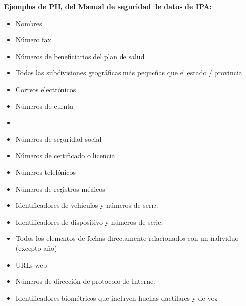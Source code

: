 \documentclass[11pt,en]{elegantpaper}
\begin{document}
\begin{enumerate}
\noindent
\textbf{Ejemplos de PII, del Manual de seguridad de datos de IPA:}

\begin{multicols}{3}

\begin{itemize}
	\item Nombres
	
	\item Número fax
	
	\item Números de beneficiarios del plan de salud
	
	\item Todas las subdivisiones geográficas más pequeñas que el estado / provincia
	
	\item Correos electrónicos
	
	\item Números de cuenta
	
	\item[\vspace{\fill}]
	
	\item Números de seguridad social
	
	\item Números de certificado o licencia
	
	\item Números telefónicos
	
	\item Números de registros médicos
	
	\item Identificadores de vehículos y números de serie.
	
	\item Identificadores de dispositivo y números de serie.

	\item Todos los elementos de fechas directamente relacionados con un individuo (excepto año)
		
	\item URLs web
	
	\item Números de dirección de protocolo de Internet
	
	\item Identificadores biométricos que incluyen huellas dactilares y de voz 
	
\end{itemize}

\end{multicols}


\end{enumerate}
\end{document}
